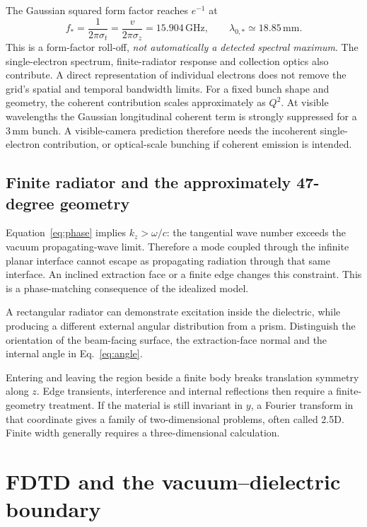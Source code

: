 \documentclass[11pt,a4paper]{article}
\newcommand{\unit}[1]{\,\mathrm{#1}}
\numberwithin{equation}{section}
\begin{document}
The Gaussian squared form factor reaches \(e^{-1}\) at
\begin{equation}
 f_*=\frac{1}{2\pi\sigma_t}=\frac{v}{2\pi\sigma_z}=15.904\unit{GHz},
 \qquad \lambda_{0,*}\simeq18.85\unit{mm}.
\end{equation}
This is a form-factor roll-off, \emph{not automatically a detected spectral
maximum}. The single-electron spectrum, finite-radiator response and
collection optics also contribute. A direct representation of individual
electrons does not remove the grid's spatial and temporal bandwidth limits.
For a fixed bunch shape and geometry, the coherent contribution scales
approximately as \(Q^2\). At visible wavelengths the Gaussian longitudinal
coherent term is strongly suppressed for a \(3\unit{mm}\) bunch. A visible-camera
prediction therefore needs the incoherent single-electron contribution,
or optical-scale bunching if coherent emission is intended.

\subsection{Finite radiator and the approximately 47-degree geometry}

Equation~\eqref{eq:phase} implies \(k_z>\omega/c\): the tangential wave
number exceeds the vacuum propagating-wave limit. Therefore a mode
coupled through the infinite planar interface cannot escape as propagating
radiation through that same interface. An inclined extraction face or a
finite edge changes this constraint. This is a phase-matching consequence
of the idealized model.

A rectangular radiator can demonstrate excitation inside the dielectric,
while producing a different external angular distribution from a prism.
Distinguish the orientation of the beam-facing surface, the extraction-face
normal and the internal angle in Eq.~\eqref{eq:angle}.

Entering and leaving the region beside a finite body breaks translation
symmetry along \(z\). Edge transients, interference and internal reflections
then require a finite-geometry treatment. If the material is still invariant
in \(y\), a Fourier transform in that coordinate gives a family of
two-dimensional problems, often called 2.5D. Finite width generally requires
a three-dimensional calculation.

\section{FDTD and the vacuum--dielectric boundary}
\label{sec:fdtd}
\end{document}
